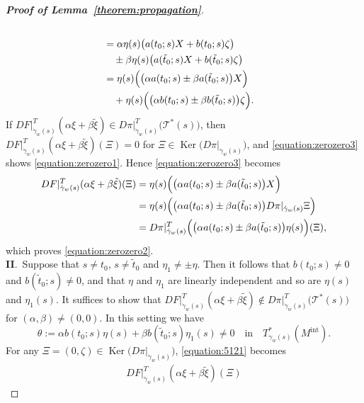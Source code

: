 \documentclass[a4paper,11pt,reqno]{amsart}
\numberwithin{equation}{section}
\theoremstyle{definition}
\theoremstyle{remark}
\begin{document}
\begin{proof}[{\bf Proof of Lemma~\ref{theorem:propagation}}]
\begin{align}
\label{equation:5121}
\\
& =
  \alpha\eta(s)\bigl(a(t_0;s)X+b(t_0;s)\zeta\bigr)
\nonumber
\\
& \quad \pm
  \beta\eta(s)\bigl(a(\tilde{t}_0;s)X+b(\tilde{t}_0;s)\zeta\bigr) 
\nonumber
\\
& =
  \eta(s)
  \Bigl(\bigl(\alpha a(t_0;s)\pm\beta a(\tilde{t}_0;s)\bigr)X\Bigr)
\nonumber
\\
& \quad +
  \eta(s)
  \Bigl(\bigl(\alpha b(t_0;s)\pm\beta b(\tilde{t}_0;s)\bigr)\zeta\Bigr). 
\label{equation:zerozero3}
\end{align}
%
%
If 
$DF\vert^T_{\dot{\gamma}_w(s)}(\alpha\xi+\beta\tilde{\xi}) \in D\pi\vert^T_{\dot{\gamma}_w(s)}\bigl(\mathcal{T}^\ast(s)\bigr)$, 
then $DF\vert^T_{\dot{\gamma}_w(s)}(\alpha\xi+\beta\tilde{\xi})(\Xi)=0$ 
for $\Xi \in \operatorname{Ker}\bigl(D\pi\vert_{\dot{\gamma}_w(s)}\bigr)$,  
and \eqref{equation:zerozero3} shows \eqref{equation:zerozero1}. 
Hence \eqref{equation:zerozero3} becomes 
%
%
\begin{align*}
  DF\vert^T_{\dot{\gamma}_w(s)}(\alpha\xi+\beta\tilde{\xi})(\Xi) 
& =
  \eta(s)
  \Bigl(\bigl(\alpha a(t_0;s)\pm \beta a(\tilde{t}_0;s)\bigr)X\Bigr)
\\
& =
  \eta(s)
  \Bigl(
  \bigl(\alpha a(t_0;s)\pm \beta a(\tilde{t}_0;s)\bigr)
  D\pi\vert_{\dot{\gamma}_w(s)}\Xi
  \Bigr)
\\
& =
  D\pi\vert^T_{\dot{\gamma}_w(s)}
  \Bigl(
  \bigl(\alpha a(t_0;s)\pm \beta a(\tilde{t}_0;s)\bigr)\eta(s)
  \Bigr)
  (\Xi),
\end{align*}
%
%
which proves \eqref{equation:zerozero2}. 
%
%
\vspace{6pt}
\\
{\bf II}.\ 
Suppose that $s \ne t_0$, $s \ne \tilde{t}_0$ and $\eta_1\ne\pm\eta$. 
Then it follows that $b(t_0;s)\ne0$ and $b(\tilde{t}_0;s)\ne0$, 
and that $\eta$ and $\eta_1$ are linearly independent  
and so are $\eta(s)$ and $\eta_1(s)$.  
It suffices to show that 
$DF\vert^T_{\dot{\gamma}_w(s)}(\alpha\xi+\beta\tilde{\xi}) \not\in D\pi\vert^T_{\dot{\gamma}_w(s)}\bigl(\mathcal{T}^\ast(s)\bigr)$ 
for $(\alpha,\beta)\ne(0,0)$. 
In this setting we have 
%
%
$$
\theta
:=
\alpha b(t_0;s) \eta(s) 
+ 
\beta b(\tilde{t}_0;s) \eta_1(s)
\ne
0
\quad
\text{in}
\quad
T^\ast_{\dot{\gamma}_w(s)}(M^\text{int}). 
$$
%
%
For any $\Xi=(0,\zeta) \in \operatorname{Ker}\bigl(D\pi\vert_{\dot{\gamma}_w(s)}\bigr)$, \eqref{equation:5121} becomes
%
%
\begin{align*}
  DF\vert^T_{\dot{\gamma}_w(s)}(\alpha\xi+\beta\tilde{\xi})(\Xi)

\end{align*}
\end{proof}
\end{document}
